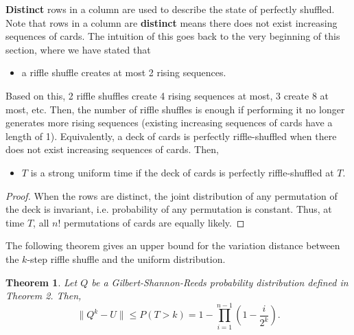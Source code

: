 \documentclass[12pt]{article}
\theoremstyle{plain}
\newtheorem{theorem}{Theorem}
\theoremstyle{definition}
\theoremstyle{remark}
\begin{document}
\textbf{Distinct} rows in a column are used to describe the state of perfectly shuffled. Note that rows in a column are \textbf{distinct} means there does not exist increasing sequences of cards. The intuition of this goes back to the very beginning of this section, where we have stated that 
\begin{itemize}
    \item a riffle shuffle creates at most 2 rising sequences.
\end{itemize}
Based on this, 2 riffle shuffles create 4 rising sequences at most, 3 create 8 at most, etc. Then, the number of riffle shuffles is enough if performing it no longer generates more rising sequences (existing increasing sequences of cards have a length of 1). Equivalently, a deck of cards is perfectly riffle-shuffled when there does not exist increasing sequences of cards. Then,
\begin{itemize}
    \item $T$ is a strong uniform time if the deck of cards is perfectly riffle-shuffled at $T$.
\end{itemize}

\begin{proof}\cite{1.1}
When the rows are distinct, the joint distribution of any permutation of the deck is invariant, i.e. probability of any permutation is constant. Thus, at time $T$, all $n!$ permutations of cards are equally likely.
\end{proof}

The following theorem gives an upper bound for the variation distance between the $k$-step riffle shuffle and the uniform distribution.

\begin{theorem}\cite[Theorem~5 on \pno~344]{1.1}
Let $Q$ be a Gilbert-Shannon-Reeds probability distribution defined in Theorem 2. Then,
\[   \big\|Q^k-U\big\| \leq P(T > k) = 1 - \prod_{i=1}^{n-1}(1-\frac{i}{2^k}).  \]
\end{theorem}
\end{document}
